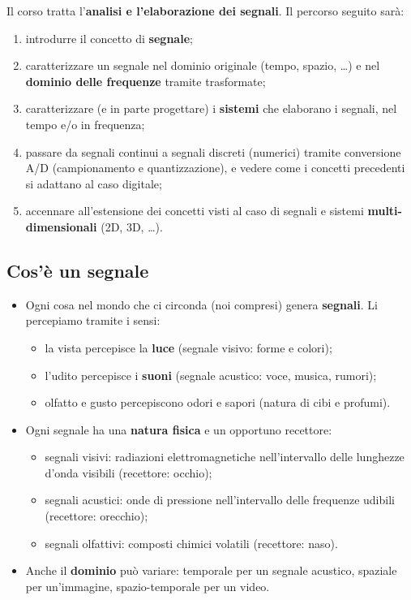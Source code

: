 \documentclass[12pt, a4paper]{article}
\begin{document}
Il corso tratta l'\textbf{analisi e l'elaborazione dei segnali}. Il percorso seguito sarà:
\begin{enumerate}
    \item introdurre il concetto di \textbf{segnale};
    \item caratterizzare un segnale nel dominio originale (tempo, spazio, \dots) e nel \textbf{dominio delle frequenze} tramite trasformate;
    \item caratterizzare (e in parte progettare) i \textbf{sistemi} che elaborano i segnali, nel tempo e/o in frequenza;
    \item passare da segnali continui a segnali discreti (numerici) tramite conversione A/D (campionamento e quantizzazione), e vedere come i concetti precedenti si adattano al caso digitale;
    \item accennare all'estensione dei concetti visti al caso di segnali e sistemi \textbf{multi-dimensionali} (2D, 3D, \dots).
\end{enumerate}

\subsection{Cos'è un segnale}

\begin{itemize}
    \item Ogni cosa nel mondo che ci circonda (noi compresi) genera \textbf{segnali}. Li percepiamo tramite i sensi:
    \begin{itemize}
        \item la vista percepisce la \textbf{luce} (segnale visivo: forme e colori);
        \item l'udito percepisce i \textbf{suoni} (segnale acustico: voce, musica, rumori);
        \item olfatto e gusto percepiscono odori e sapori (natura di cibi e profumi).
    \end{itemize}
    \item Ogni segnale ha una \textbf{natura fisica} e un opportuno recettore:
    \begin{itemize}
        \item segnali visivi: radiazioni elettromagnetiche nell'intervallo delle lunghezze d'onda visibili (recettore: occhio);
        \item segnali acustici: onde di pressione nell'intervallo delle frequenze udibili (recettore: orecchio);
        \item segnali olfattivi: composti chimici volatili (recettore: naso).
    \end{itemize}
    \item Anche il \textbf{dominio} può variare: temporale per un segnale acustico, spaziale per un'immagine, spazio-temporale per un video.
\end{itemize}
\end{document}
